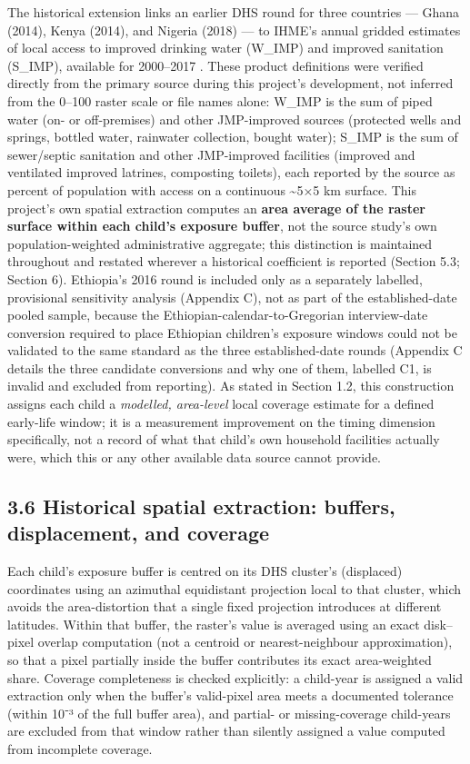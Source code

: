 The historical extension links an earlier DHS round for three countries --- Ghana (2014), Kenya (2014), and Nigeria (2018) --- to IHME's annual gridded estimates of local access to improved drinking water (W\_IMP) and improved sanitation (S\_IMP), available for 2000--2017 \parencite{LBDWaSH2020}. These product definitions were verified directly from the primary source during this project's development, not inferred from the 0--100 raster scale or file names alone: W\_IMP is the sum of piped water (on- or off-premises) and other JMP-improved sources (protected wells and springs, bottled water, rainwater collection, bought water); S\_IMP is the sum of sewer/septic sanitation and other JMP-improved facilities (improved and ventilated improved latrines, composting toilets), each reported by the source as percent of population with access on a continuous \textasciitilde{}5×5 km surface. This project's own spatial extraction computes an \textbf{area average of the raster surface within each child's exposure buffer}, not the source study's own population-weighted administrative aggregate; this distinction is maintained throughout and restated wherever a historical coefficient is reported (Section 5.3; Section 6). Ethiopia's 2016 round is included only as a separately labelled, provisional sensitivity analysis (Appendix C), not as part of the established-date pooled sample, because the Ethiopian-calendar-to-Gregorian interview-date conversion required to place Ethiopian children's exposure windows could not be validated to the same standard as the three established-date rounds (Appendix C details the three candidate conversions and why one of them, labelled C1, is invalid and excluded from reporting). As stated in Section 1.2, this construction assigns each child a \textit{modelled, area-level} local coverage estimate for a defined early-life window; it is a measurement improvement on the timing dimension specifically, not a record of what that child's own household facilities actually were, which this or any other available data source cannot provide.

\subsection*{3.6 Historical spatial extraction: buffers, displacement, and coverage}

Each child's exposure buffer is centred on its DHS cluster's (displaced) coordinates using an azimuthal equidistant projection local to that cluster, which avoids the area-distortion that a single fixed projection introduces at different latitudes. Within that buffer, the raster's value is averaged using an exact disk--pixel overlap computation (not a centroid or nearest-neighbour approximation), so that a pixel partially inside the buffer contributes its exact area-weighted share. Coverage completeness is checked explicitly: a child-year is assigned a valid extraction only when the buffer's valid-pixel area meets a documented tolerance (within 10⁻³ of the full buffer area), and partial- or missing-coverage child-years are excluded from that window rather than silently assigned a value computed from incomplete coverage.

